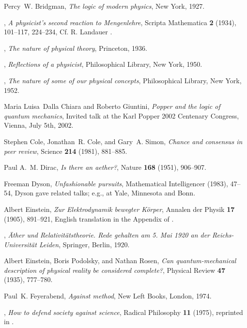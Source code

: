\documentclass{article}
\begin{document}
\begin{thebibliography}{10}
Percy~W. Bridgman, \emph{The logic of modern physics}, New York, 1927.

\bysame, \emph{A physicist's second reaction to {M}engenlehre}, Scripta
  Mathematica \textbf{2} (1934), 101--117, 224--234, Cf. R. Landauer
  \cite{landauer-95}.

\bysame, \emph{The nature of physical theory}, Princeton, 1936.

\bysame, \emph{Reflections of a physicist}, Philosophical Library, New York,
  1950.

\bysame, \emph{The nature of some of our physical concepts}, Philosophical
  Library, New York, 1952.

Maria Luisa~Dalla Chiara and Roberto Giuntini, \emph{Popper and the logic of
  quantum mechanics}, Invited talk at the Karl Popper 2002 Centenary Congress,
  Vienna, July 5th, 2002.

Stephen Cole, Jonathan~R. Cole, and Gary~A. Simon, \emph{Chance and consensus
  in peer review}, Science \textbf{214} (1981), 881--885.

Paul A.~M. Dirac, \emph{Is there an aether?}, Nature \textbf{168} (1951),
  906--907.

Freeman Dyson, \emph{Unfashionable pursuits}, Mathematical Intelligencer
  (1983), 47--54, {D}yson gave related talks; e.g., at {Y}ale, Minnesota and
  {B}onn.

Albert Einstein, \emph{{Z}ur {E}lektrodynamik bewegter {K}{\"{o}}rper}, Annalen
  der Physik \textbf{17} (1905), 891--921, {E}nglish translation in the
  Appendix of \cite{miller-1998}.

\bysame, \emph{{\"{A}}ther und {R}elativit{\"{a}}tstheorie. {R}ede gehalten am
  5. {M}ai 1920 an der {R}eichs-{U}niversit{\"{a}}t {L}eiden}, Springer,
  Berlin, 1920.

Albert Einstein, Boris Podolsky, and Nathan Rosen, \emph{Can quantum-mechanical
  description of physical reality be considered complete?}, Physical Review
  \textbf{47} (1935), 777--780.

Paul~K. Feyerabend, \emph{Against method}, New Left Books, London, 1974.

\bysame, \emph{How to defend society against science}, Radical Philosophy
  \textbf{11} (1975), reprinted in \cite{feyer-81}.


\end{thebibliography}
\end{document}
